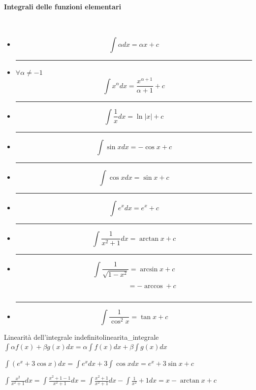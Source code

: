 \documentclass[12pt]{report}
\newcommand{\nmu}{}
\begin{document}
			\paragraph{Integrali delle funzioni elementari} \quad \\
			\begin{itemize}
				\item \[
				\int \alpha dx = \alpha x + c
				\]
				\par\noindent\rule{\linewidth}{0.5pt}\par

				\item $\forall \alpha \neq -1$ \[
				\int x^\alpha dx = \frac{x^{\alpha+1}}{\alpha+1} + c
				\]
				\par\noindent\rule{\linewidth}{0.5pt}\par
				\item \[
				\int\frac{1}{x}dx = \ln|x| + c
				\]
				\par\noindent\rule{\linewidth}{0.5pt}\par
				\item \[
				\int \sin xdx = -\cos x + c
				\]
					\par\noindent\rule{\linewidth}{0.5pt}\par
				\item \[
				\int \cos x dx = \sin x + c
				\]
					\par\noindent\rule{\linewidth}{0.5pt}\par
				\item \[
				\int e^xdx = e^x + c
				\]
					\par\noindent\rule{\linewidth}{0.5pt}\par

				\item \[
				\int \frac{1}{x^2 + 1}dx = \arctan x + c
				\]
					\par\noindent\rule{\linewidth}{0.5pt}\par
				\item \[
				\int \frac{1}{\sqrt{1 -x^2}} = \arcsin x + c
				\]
				\[
				\phantom{\int \frac{1}{\sqrt{1 -x^2}}} = -\arccos + c
				\]
				\par\noindent\rule{\linewidth}{0.5pt}\par
				\item \[
				\int \frac{1}{\cos^2 x} = \tan x + c
				\]
			\end{itemize}
			\begin{note}{\nmu Linearità dell'integrale indefinito}{linearita_integrale}
				$\int \alpha f(x) + \beta g(x)dx = \alpha\int f(x)dx + \beta\int g(x)dx$
			\end{note}
			\begin{example}{}{}
				$\int (e^x + 3\cos x)dx = \int e^xdx + 3\int \cos x dx = e^x + 3\sin x + c$
			\end{example}
			\begin{example}{}{}
				$\int \frac{x^2}{x^2+1}dx = \int \frac{x^2 + 1 - 1}{x^2 + 1}dx = \int \frac{x^2 + 1}{x^2 + 1}dx - \int \frac{1}{x^2} + 1dx = x - \arctan x + c$
			\end{example}
\end{document}
